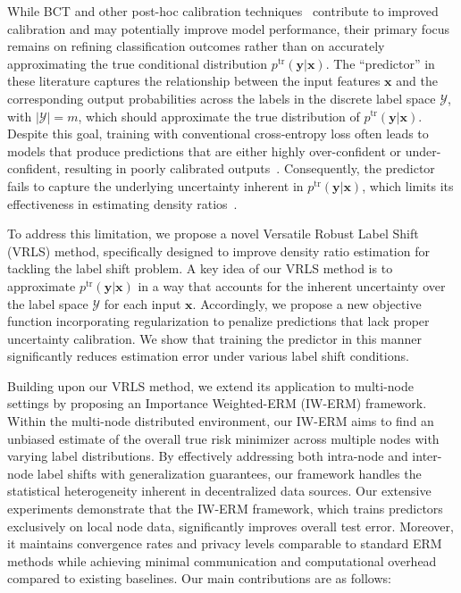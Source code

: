 While BCT and other post-hoc calibration techniques~\citep{on_cali, 10.5555/3454287.3455390, NEURIPS2021_61f3a6db, sun2024minimum} contribute to improved calibration and may potentially improve model performance, their primary focus remains on refining classification outcomes rather than on accurately approximating the true conditional distribution $p^{\text{tr}}(\boldsymbol{y} | \boldsymbol{x})$. 
The ``predictor'' in these literature captures the relationship between the input features \( \boldsymbol{x} \) and the corresponding output probabilities across the labels in the discrete label space \( \mathcal{Y} \), with \( |\mathcal{Y}| = m \), which should approximate the true distribution of $p^{\text{tr}}(\boldsymbol{y} | \boldsymbol{x})$. 
Despite this goal, training with conventional cross-entropy loss often leads to models that produce predictions that are either highly over-confident or under-confident, resulting in poorly calibrated outputs~\citep{calibration_modern}.
Consequently, the predictor fails to capture the underlying uncertainty inherent in $p^{\text{tr}}(\boldsymbol{y} | \boldsymbol{x})$, which limits its effectiveness in estimating density ratios~\citep{AlexandariEM, mlls, guo2020ltf, modern_calib, pereyra2017regularizing, FedAvg}.

To address this limitation, we propose a novel Versatile Robust Label Shift (VRLS) method, specifically designed to improve density ratio estimation for tackling the label shift problem. 
A key idea of our VRLS method is to approximate $p^{\text{tr}}(\boldsymbol{y} | \boldsymbol{x})$ in a way that accounts for the inherent uncertainty over the label space $\mathcal{Y}$ for each input $\boldsymbol{x}$. Accordingly, we propose a new objective function incorporating regularization to penalize predictions that lack proper uncertainty calibration. 
We show that training the predictor in this manner significantly reduces estimation error under various label shift conditions.

Building upon our VRLS method, we extend its application to multi-node settings by proposing an Importance Weighted-ERM (IW-ERM) framework. Within the multi-node distributed environment, our IW-ERM aims to find an unbiased estimate of the overall true risk minimizer across multiple nodes with varying label distributions. By effectively addressing both intra-node and inter-node label shifts with generalization guarantees, our framework handles the statistical heterogeneity inherent in decentralized data sources.
Our extensive experiments demonstrate that the IW-ERM framework, which trains predictors exclusively on local node data, significantly improves overall test error. Moreover, it maintains convergence rates and privacy levels comparable to standard ERM methods while achieving minimal communication and computational overhead compared to existing baselines.
Our main contributions are as follows:

